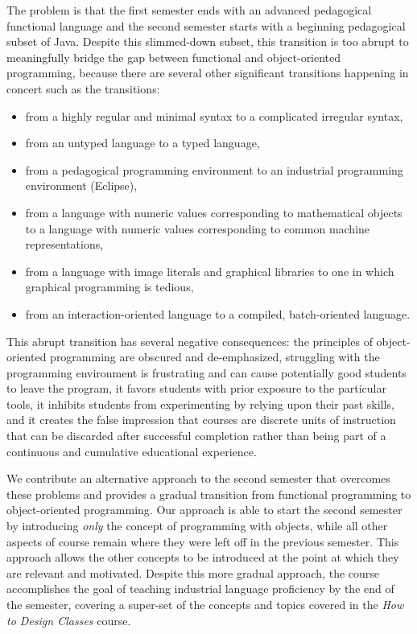 \documentclass[submission,copyright]{eptcs}
\begin{document}
The problem is that the first semester ends with an advanced
pedagogical functional language and the second semester starts with a
beginning pedagogical subset of Java.  Despite this slimmed-down
subset, this transition is too abrupt to meaningfully bridge the gap
between functional and object-oriented programming, because there are
several other significant transitions happening in concert such as the
transitions:
\begin{itemize}
\item from a highly regular and minimal syntax to a complicated
  irregular syntax,

\item from an untyped language to a typed language,

\item from a pedagogical programming environment to an industrial
programming environment (Eclipse),

\item from a language with numeric values corresponding to
  mathematical objects to a language with numeric values corresponding
  to common machine representations,

\item from a language with image literals and graphical libraries to
  one in which graphical programming is tedious,

\item from an interaction-oriented language to a compiled,
  batch-oriented language.  
\end{itemize}

This abrupt transition has several negative consequences: the
principles of object-oriented programming are obscured and
de-emphasized, struggling with the programming environment is
frustrating and can cause potentially good students to leave the
program, it favors students with prior exposure to the particular
tools, it inhibits students from experimenting by relying upon their
past skills, and it creates the false impression that courses are
discrete units of instruction that can be discarded after successful
completion rather than being part of a continuous and cumulative
educational experience.


We contribute an alternative approach to the second semester that
overcomes these problems and provides a gradual transition from
functional programming to object-oriented programming.  Our approach
is able to start the second semester by introducing \emph{only} the
concept of programming with objects, while all other aspects of course
remain where they were left off in the previous semester.  This
approach allows the other concepts to be introduced at the point at
which they are relevant and motivated.  Despite this more gradual
approach, the course accomplishes the goal of teaching industrial
language proficiency by the end of the semester, covering a super-set
of the concepts and topics covered in the \emph{How to Design Classes}
course.
\end{document}
